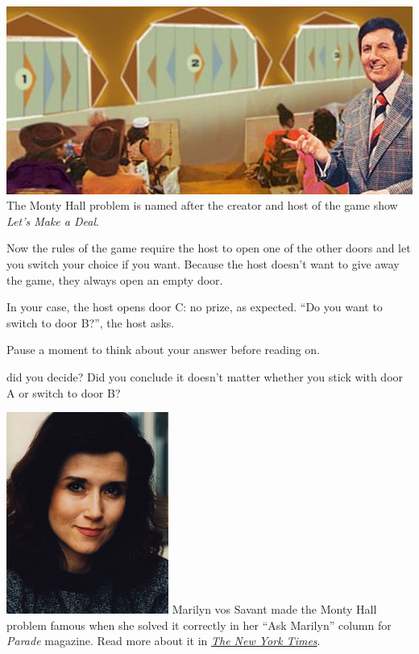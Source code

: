 \documentclass[justified]{tufte-book}
\theoremstyle{definition}
\theoremstyle{definition}
\theoremstyle{definition}
\theoremstyle{remark}
\begin{document}
\begin{marginfigure}
\includegraphics{img/lets_make_a_deal.png} The Monty Hall problem is
named after the creator and host of the game show \emph{Let's Make a
Deal}.
\end{marginfigure}

Now the rules of the game require the host to open one of the other
doors and let you switch your choice if you want. Because the host
doesn't want to give away the game, they always open an empty door.

In your case, the host opens door C: no prize, as expected. ``Do you
want to switch to door B?'', the host asks.

Pause a moment to think about your answer before reading on.

 did you decide? Did you conclude it doesn't matter
whether you stick with door A or switch to door B?

\begin{marginfigure}
\includegraphics{img/marilyn_vos_savant.png} Marilyn vos Savant made the
Monty Hall problem famous when she solved it correctly in her ``Ask
Marilyn'' column for \emph{Parade} magazine. Read more about it in
\href{https://www.nytimes.com/1991/07/21/us/behind-monty-hall-s-doors-puzzle-debate-and-answer.html}{\emph{The
New York Times}}.
\end{marginfigure}
\end{document}

